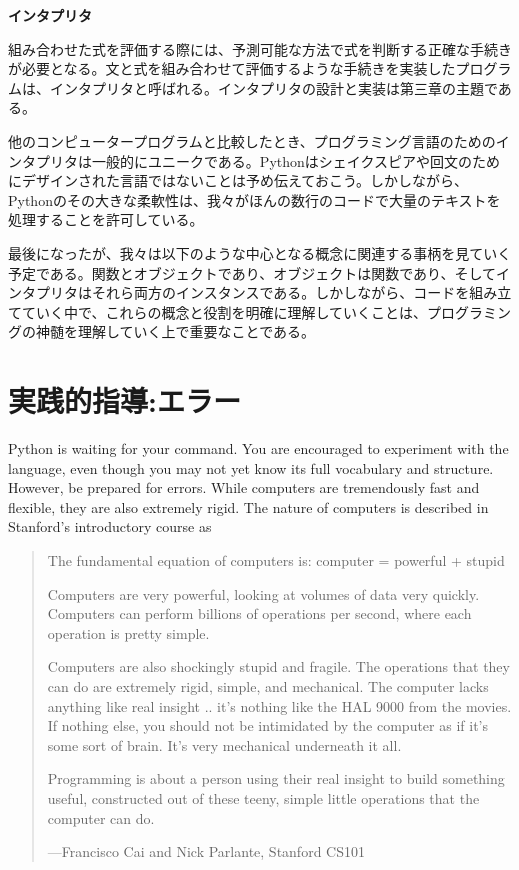\documentclass[letterpaper,10pt,dvipdfmx]{sphinxmanual}
\begin{document}
\textbf{インタプリタ}

組み合わせた式を評価する際には、予測可能な方法で式を判断する正確な手続きが必要となる。文と式を組み合わせて評価するような手続きを実装したプログラムは、インタプリタと呼ばれる。インタプリタの設計と実装は第三章の主題である。

他のコンピュータープログラムと比較したとき、プログラミング言語のためのインタプリタは一般的にユニークである。Pythonはシェイクスピアや回文のためにデザインされた言語ではないことは予め伝えておこう。しかしながら、Pythonのその大きな柔軟性は、我々がほんの数行のコードで大量のテキストを処理することを許可している。

最後になったが、我々は以下のような中心となる概念に関連する事柄を見ていく予定である。関数とオブジェクトであり、オブジェクトは関数であり、そしてインタプリタはそれら両方のインスタンスである。しかしながら、コードを組み立てていく中で、これらの概念と役割を明確に理解していくことは、プログラミングの神髄を理解していく上で重要なことである。


\section{実践的指導:エラー}
\label{functions:id5}
Python is waiting for your command. You are encouraged to experiment with the language, even though you may not yet know its full vocabulary and structure. However, be prepared for errors. While computers are tremendously fast and flexible, they are also extremely rigid. The nature of computers is described in Stanford's introductory course as
\begin{quote}

The fundamental equation of computers is: computer = powerful + stupid

Computers are very powerful, looking at volumes of data very quickly. Computers can perform billions of operations per second, where each operation is pretty simple.

Computers are also shockingly stupid and fragile. The operations that they can do are extremely rigid, simple, and mechanical. The computer lacks anything like real insight .. it's nothing like the HAL 9000 from the movies. If nothing else, you should not be intimidated by the computer as if it's some sort of brain. It's very mechanical underneath it all.

Programming is about a person using their real insight to build something useful, constructed out of these teeny, simple little operations that the computer can do.

\begin{flushright}
---Francisco Cai and Nick Parlante, Stanford CS101
\end{flushright}
\end{quote}
\end{document}
